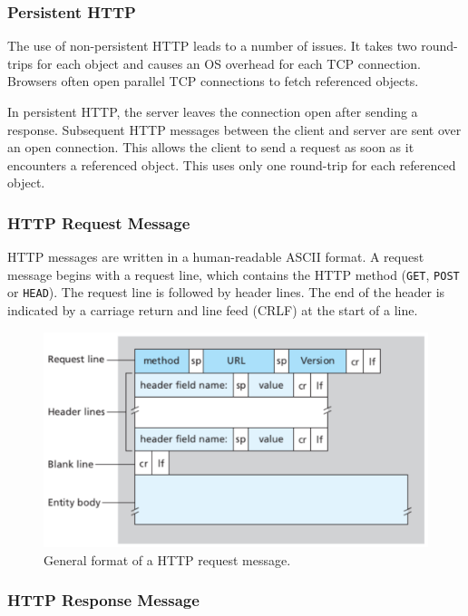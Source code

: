 \subsubsection{Persistent HTTP}

The use of non-persistent HTTP leads to a number of issues.
It takes two round-trips for each object and causes an OS overhead for each TCP connection.
Browsers often open parallel TCP connections to fetch referenced objects.

In persistent HTTP, the server leaves the connection open after sending a response.
Subsequent HTTP messages between the client and server are sent over an open connection.
This allows the client to send a request as soon as it encounters a referenced object.
This uses only one round-trip for each referenced object.

\subsubsection{HTTP Request Message}

HTTP messages are written in a human-readable ASCII format.
A request message begins with a request line, which contains the HTTP method (\texttt{GET}, \texttt{POST} or \texttt{HEAD}).
The request line is followed by header lines.
The end of the header is indicated by a carriage return and line feed (CRLF) at the start of a line.

\begin{figure}[htp]
  \centering
  \includegraphics[width=12cm]{unit-17/figures/http-request.png}
  \caption*{General format of a HTTP request message.}
\end{figure}

\subsubsection{HTTP Response Message}

